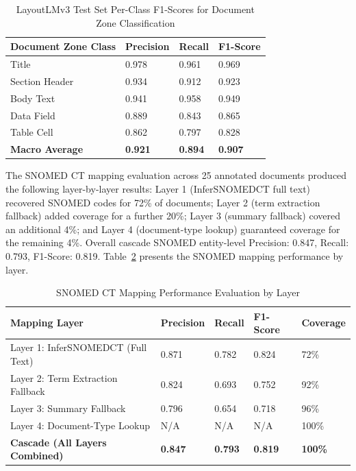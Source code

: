 \begin{table}[htbp]
\centering
\caption{LayoutLMv3 Test Set Per-Class F1-Scores for Document Zone Classification}
\label{tab:layoutlmv3_results}
\begin{tabular}{|p{4cm}|p{3cm}|p{3cm}|p{3cm}|}
\hline
\textbf{Document Zone Class} & \textbf{Precision} & \textbf{Recall} & \textbf{F1-Score} \\
\hline
Title & 0.978 & 0.961 & 0.969 \\
\hline
Section Header & 0.934 & 0.912 & 0.923 \\
\hline
Body Text & 0.941 & 0.958 & 0.949 \\
\hline
Data Field & 0.889 & 0.843 & 0.865 \\
\hline
Table Cell & 0.862 & 0.797 & 0.828 \\
\hline
\textbf{Macro Average} & \textbf{0.921} & \textbf{0.894} & \textbf{0.907} \\
\hline
\end{tabular}
\end{table}

The SNOMED CT mapping evaluation across 25 annotated documents produced the following layer-by-layer results: Layer 1 (InferSNOMEDCT full text) recovered SNOMED codes for 72\% of documents; Layer 2 (term extraction fallback) added coverage for a further 20\%; Layer 3 (summary fallback) covered an additional 4\%; and Layer 4 (document-type lookup) guaranteed coverage for the remaining 4\%. Overall cascade SNOMED entity-level Precision: 0.847, Recall: 0.793, F1-Score: 0.819. Table~\ref{tab:snomed_mapping_results} presents the SNOMED mapping performance by layer.

\begin{table}[htbp]
\centering
\caption{SNOMED CT Mapping Performance Evaluation by Layer}
\label{tab:snomed_mapping_results}
\begin{tabular}{|p{5cm}|p{1.8cm}|p{1.8cm}|p{1.8cm}|p{2cm}|}
\hline
\textbf{Mapping Layer} & \textbf{Precision} & \textbf{Recall} & \textbf{F1-Score} & \textbf{Coverage} \\
\hline
Layer 1: InferSNOMEDCT (Full Text) & 0.871 & 0.782 & 0.824 & 72\% \\
\hline
Layer 2: Term Extraction Fallback & 0.824 & 0.693 & 0.752 & 92\% \\
\hline
Layer 3: Summary Fallback & 0.796 & 0.654 & 0.718 & 96\% \\
\hline
Layer 4: Document-Type Lookup & N/A & N/A & N/A & 100\% \\
\hline
\textbf{Cascade (All Layers Combined)} & \textbf{0.847} & \textbf{0.793} & \textbf{0.819} & \textbf{100\%} \\
\hline
\end{tabular}
\end{table}

